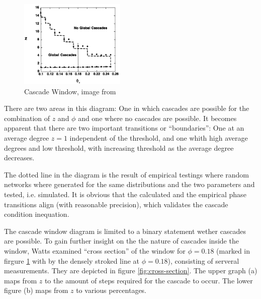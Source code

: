 \documentclass{sig-alternate-05-2015}
\begin{document}
\begin{figure}[h!]
  \centering
  \includegraphics[width=0.45\textwidth]{img/cascade-regimes-with-cross-section.png}
  \caption{Cascade Window, image from \cite{simplemodel}}
  \label{fig:cascade-window}
\end{figure}

There are two areas in this diagram: One in which cascades are possible for the combination of $z$ and $\phi$ and one where no cascades are possible. It becomes apparent that there are two important transitions or ``boundaries'': One at an average degree $z = 1$ independent of the threshold, and one whith high average degrees and low threshold, with increasing threshold as the average degree decreases.

The dotted line in the diagram is the result of empirical testings where random networks where generated for the same distributions and the two parameters and tested, i.e. simulated. It is obvious that the calculated and the empirical phase transitions align (with reasonable precision), which validates the cascade condition inequation.

The cascade window diagram is limited to a binary statement wether cascades are possible. To gain further insight on the the nature of cascades inside the window, Watts examined ``cross section'' of the window for $\phi=0.18$ (marked in firgure \ref{fig:cascade-window} with by the densely stroked line at $\phi=0.18$), consisting of serveral measurements. They are depicted in figure \ref{fig:cross-section}. The upper graph (a) maps from $z$ to the amount of steps required for the cascade to occur. The lower figure (b) maps from $z$ to various percentages.
\end{document}
